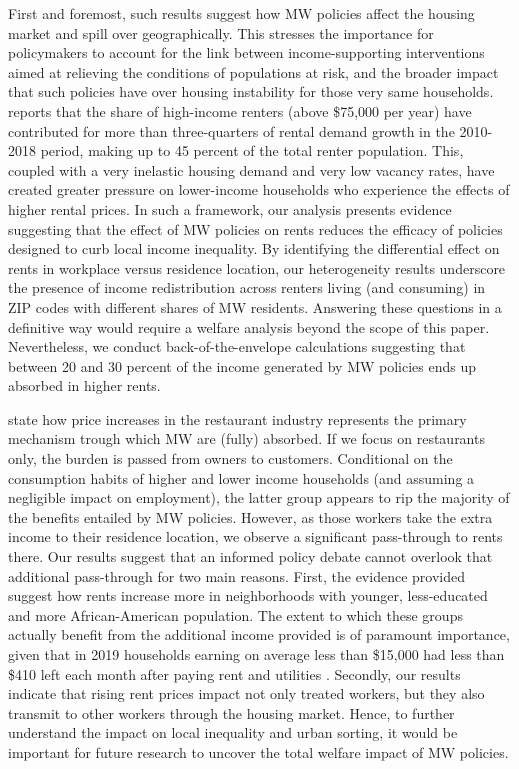 First and foremost, such results suggest how MW policies affect the housing market and 
spill over geographically. This stresses the importance for policymakers to account for 
the link between income-supporting interventions aimed at relieving the conditions of 
populations at risk, and the broader impact that such policies have over housing 
instability for those very same households. \textcite{fernald2020americas} reports that 
the share of high-income renters (above \$75,000 per year) have contributed for more than 
three-quarters of rental demand growth in the 2010-2018 period, making up to 45 percent of 
the total renter population. This, coupled with a very inelastic housing demand and very low 
vacancy rates, have created greater pressure on lower-income households who experience the
effects of higher rental prices. 
In such a framework, our analysis presents evidence suggesting that the effect of MW policies 
on rents reduces the efficacy of policies designed to curb local income inequality. By 
identifying the differential effect on rents in workplace versus residence location, our
heterogeneity results underscore the presence of income redistribution across renters 
living (and consuming) in ZIP codes with different shares of MW residents. Answering these 
questions in a definitive way would require a welfare analysis beyond the scope of this paper. 
Nevertheless, we conduct back-of-the-envelope calculations suggesting that between 20 and 
30 percent of the income generated by MW policies ends up absorbed in higher rents.

\textcite{allegretto2018local} state how price increases in the restaurant industry represents 
the primary mechanism trough which MW are (fully) absorbed. If we focus on restaurants only, 
the burden is passed from owners to customers. Conditional on the consumption habits of higher 
and lower income households (and assuming a negligible impact on employment), the latter group 
appears to rip the majority of the benefits entailed by MW policies. However, as those workers
take the extra income to their residence location, we observe a significant pass-through to 
rents there. Our results suggest that an informed policy debate cannot overlook that additional 
pass-through for two main reasons. First, the evidence provided suggest how rents increase more 
in neighborhoods with younger, less-educated and more African-American population. The extent 
to which these groups actually benefit from the additional income provided is of paramount 
importance, given that in 2019 households earning on average less than \$15,000 had less than 
\$410 left each month after paying rent and utilities \parencite{fernald2020americas}. Secondly, 
our results indicate that rising rent prices impact not only treated workers, but they also
transmit to other workers through the housing market. Hence, to further understand the impact 
on local inequality and urban sorting, it would be important for future research to uncover the 
total welfare impact of MW policies. 

 